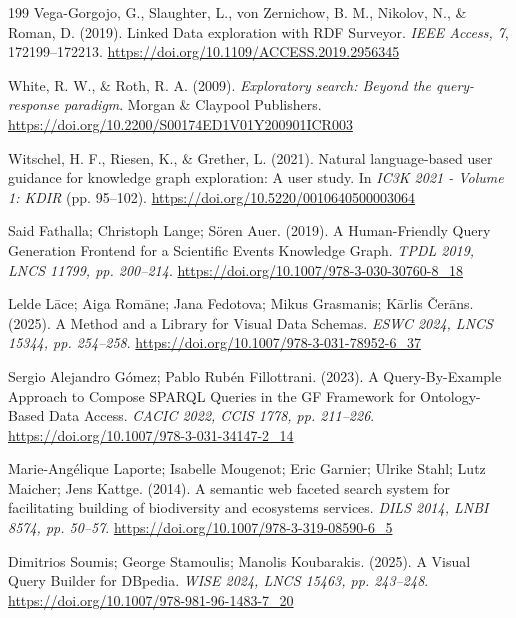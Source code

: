 \documentclass[manuscript,review,screen]{acmart}
\begin{document}
\begin{thebibliography}{199}
 Vega-Gorgojo, G., Slaughter, L., von Zernichow, B. M., Nikolov, N., \& Roman, D. (2019). Linked Data exploration with RDF Surveyor. \textit{IEEE Access, 7}, 172199--172213. \url{https://doi.org/10.1109/ACCESS.2019.2956345}

 White, R. W., \& Roth, R. A. (2009). \textit{Exploratory search: Beyond the query-response paradigm}. Morgan \& Claypool Publishers. \url{https://doi.org/10.2200/S00174ED1V01Y200901ICR003}

 Witschel, H. F., Riesen, K., \& Grether, L. (2021). Natural language-based user guidance for knowledge graph exploration: A user study. In \textit{IC3K 2021 - Volume 1: KDIR} (pp. 95--102). \url{https://doi.org/10.5220/0010640500003064}


 Said Fathalla; Christoph Lange; S\"{o}ren Auer. (2019). A Human-Friendly Query Generation Frontend for a Scientific Events Knowledge Graph. \textit{TPDL 2019, LNCS 11799, pp. 200--214}. \url{https://doi.org/10.1007/978-3-030-30760-8_18}

 Lelde L\={a}ce; Aiga Rom\={a}ne; Jana Fedotova; Mikus Grasmanis; K\={a}rlis \v{C}er\={a}ns. (2025). A Method and a Library for Visual Data Schemas. \textit{ESWC 2024, LNCS 15344, pp. 254--258}. \url{https://doi.org/10.1007/978-3-031-78952-6_37}

 Sergio Alejandro G\'{o}mez; Pablo Rub\'{e}n Fillottrani. (2023). A Query-By-Example Approach to Compose SPARQL Queries in the GF Framework for Ontology-Based Data Access. \textit{CACIC 2022, CCIS 1778, pp. 211--226}. \url{https://doi.org/10.1007/978-3-031-34147-2_14}

 Marie-Ang\'{e}lique Laporte; Isabelle Mougenot; Eric Garnier; Ulrike Stahl; Lutz Maicher; Jens Kattge. (2014). A semantic web faceted search system for facilitating building of biodiversity and ecosystems services. \textit{DILS 2014, LNBI 8574, pp. 50--57}. \url{https://doi.org/10.1007/978-3-319-08590-6_5}

 Dimitrios Soumis; George Stamoulis; Manolis Koubarakis. (2025). A Visual Query Builder for DBpedia. \textit{WISE 2024, LNCS 15463, pp. 243--248}. \url{https://doi.org/10.1007/978-981-96-1483-7_20}


\end{thebibliography}
\end{document}
